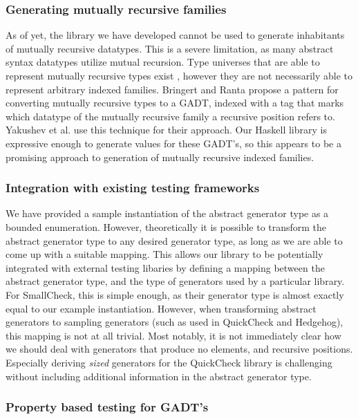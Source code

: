 \documentclass[a4paper,msc,twosized=semi]{uustthesis}
\let\oldemph\emph
\renewcommand\emph[1]{{\large\oldemph{#1}}}
\begin{document}
\subsubsection{Generating mutually recursive families}

  As of yet, the library we have developed cannot be used to generate inhabitants of 
  mutually recursive datatypes. This is a severe limitation, as many abstract syntax 
  datatypes utilize mutual recursion. Type universes that are able to represent 
  mutually recursive types exist \cite{miraldo2018sums , yakushev2009generic}, however 
  they are not necessarily able to represent arbitrary indexed families. Bringert and 
  Ranta \cite{bringert2006pattern} propose a pattern for converting mutually recursive 
  types to a GADT, indexed with a tag that marks which datatype of the mutually 
  recursive family a recursive position refers to. Yakushev et al. \cite
  {yakushev2009generic} use this technique for their approach. Our Haskell library is 
  expressive enough to generate values for these GADT's, so this appears to be a 
  promising approach to generation of mutually recursive indexed families. 

\subsubsection{Integration with existing testing frameworks}

  We have provided a sample instantiation of the abstract generator type as a bounded 
  enumeration. However, theoretically it is possible to transform the abstract 
  generator type to any desired generator type, as long as we are able to come up with 
  a suitable mapping. This allows our library to be potentially integrated with 
  external testing libaries by defining a mapping between the abstract generator type, 
  and the type of generators used by a particular library. For SmallCheck, this is 
  simple enough, as their generator type is almost exactly equal to our example 
  instantiation. However, when transforming abstract generators to sampling generators 
  (such as used in QuickCheck and Hedgehog), this mapping is not at all trivial. Most 
  notably, it is not immediately clear how we should deal with generators that produce 
  no elements, and recursive positions. Especially deriving \emph{sized} generators 
  for the QuickCheck library is challenging without including additional information 
  in the abstract generator type. 

\subsubsection{Property based testing for GADT's}
\end{document}
